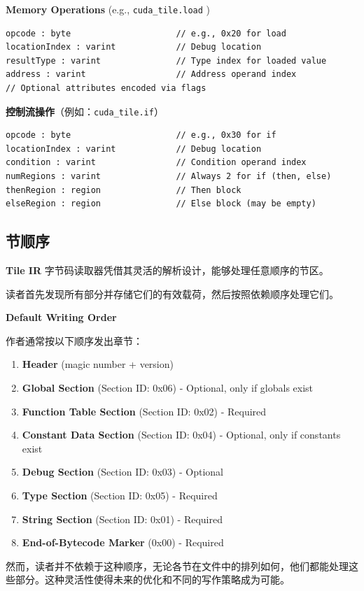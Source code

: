 \documentclass{article}
\begin{document}
\textbf{Memory Operations} (e.g., \texttt{cuda\_tile.load} )


\begin{lstlisting}
opcode : byte                     // e.g., 0x20 for load
locationIndex : varint            // Debug location
resultType : varint               // Type index for loaded value
address : varint                  // Address operand index
// Optional attributes encoded via flags
\end{lstlisting}

\textbf{控制流操作}（例如：\texttt{cuda\_tile.if}）


\begin{lstlisting}
opcode : byte                     // e.g., 0x30 for if
locationIndex : varint            // Debug location
condition : varint                // Condition operand index
numRegions : varint               // Always 2 for if (then, else)
thenRegion : region               // Then block
elseRegion : region               // Else block (may be empty)
\end{lstlisting}


\subsection{节顺序}

\textbf{Tile IR} 字节码读取器凭借其灵活的解析设计，能够处理任意顺序的节区。

读者首先发现所有部分并存储它们的有效载荷，然后按照依赖顺序处理它们。


\textbf{Default Writing Order}


作者通常按以下顺序发出章节：


\begin{enumerate}
\item \textbf{Header} (magic number + version)
\item \textbf{Global Section} (Section ID: 0x06) - Optional, only if globals exist
\item \textbf{Function Table Section} (Section ID: 0x02) - Required
\item \textbf{Constant Data Section} (Section ID: 0x04) - Optional, only if constants exist
\item \textbf{Debug Section} (Section ID: 0x03) - Optional
\item \textbf{Type Section} (Section ID: 0x05) - Required
\item \textbf{String Section} (Section ID: 0x01) - Required
\item \textbf{End-of-Bytecode Marker} (0x00) - Required

\end{enumerate}
然而，读者并不依赖于这种顺序，无论各节在文件中的排列如何，他们都能处理这些部分。这种灵活性使得未来的优化和不同的写作策略成为可能。
\end{document}
